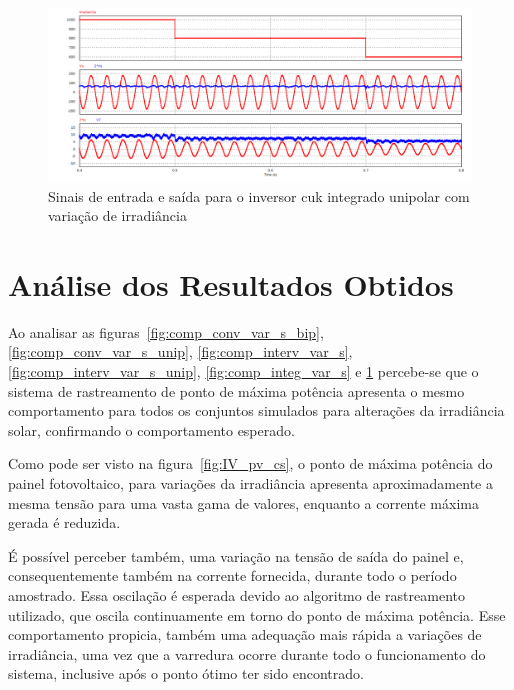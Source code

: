 \documentclass[
	12pt,				%
	openany,
	onseside,
	a4paper,			%
	english,			%
	french,				%
	spanish,			%
	brazil,				%
	]{abntex2}
\begin{document}
\begin{figure}[H]%
	\captionsetup{justification=centering}
	\centering
		\includegraphics[width= \linewidth]{comp_integ_var_s_unip}
		\caption{Sinais de entrada e saída para o inversor cuk integrado unipolar com variação de irradiância}
		\label{fig:comp_integ_var_s_unip}
\end{figure}


\chapter{Análise dos Resultados Obtidos}


Ao analisar as figuras~\ref{fig:comp_conv_var_s_bip}, \ref{fig:comp_conv_var_s_unip}, \ref{fig:comp_interv_var_s}, \ref{fig:comp_interv_var_s_unip}, \ref{fig:comp_integ_var_s} e \ref{fig:comp_integ_var_s_unip} percebe-se que o sistema de rastreamento de ponto de máxima potência apresenta o mesmo comportamento para todos os conjuntos simulados para alterações da irradiância solar, confirmando o comportamento esperado.

Como pode ser visto na figura~\ref{fig:IV_pv_cs}, o ponto de máxima potência do painel fotovoltaico, para variações da irradiância apresenta aproximadamente a mesma tensão para uma vasta gama de valores, enquanto a corrente máxima gerada é reduzida. 

É possível perceber também, uma variação na tensão de saída do painel e, consequentemente também na corrente fornecida, durante todo o período amostrado. Essa oscilação é esperada devido ao algoritmo de rastreamento utilizado, que oscila continuamente em torno do ponto de máxima potência. Esse comportamento propicia, também uma adequação mais rápida a variações de irradiância, uma vez que a varredura ocorre durante todo o funcionamento do sistema, inclusive após o ponto ótimo ter sido encontrado.
\end{document}
